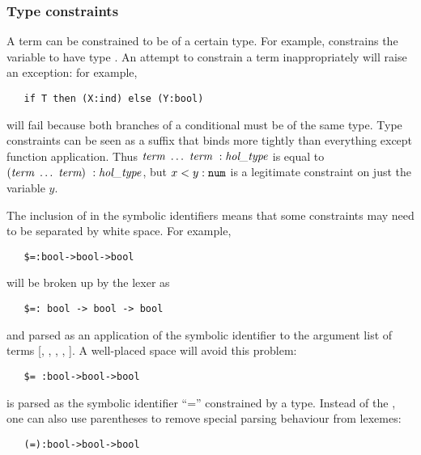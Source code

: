 \subsubsection{Type constraints}
\label{sec:parseprint-type-constraints}

A term can be constrained to be of a certain type.  For example,
 constrains the variable  to have type
. An attempt to constrain a
term inappropriately will raise an exception: for example,
\begin{hol}
\begin{verbatim}
   if T then (X:ind) else (Y:bool)
\end{verbatim}
\end{hol}
will fail because both branches of a conditional must be of the same
type.  Type constraints can be seen as a suffix that binds more
tightly than everything except function application.  Thus $\mbox{\it term}\
\ldots\ \mbox{\it term} \ : \mbox{\it hol\_type}$ is equal to $(\mbox{\it term}\ \ldots\ \mbox{\it term})\ :
\mbox{\it hol\_type}$, but $x < y:\holtxt{num}$ is a legitimate constraint on just
the variable $y$.

The inclusion of \holtxt{:} in the symbolic identifiers means that some
constraints may need to be separated by white space. For example,
\begin{hol}
\begin{verbatim}
   $=:bool->bool->bool
\end{verbatim}
\end{hol}
will be broken up by the \HOL{} lexer as
\begin{hol}
\begin{verbatim}
   $=: bool -> bool -> bool
\end{verbatim}
\end{hol}
and parsed as an application of the symbolic identifier \holtxt{\$=:} to
the argument list of terms [, \holtxt{->}, \holtxt{bool},
\holtxt{->}, \holtxt{bool}]. A well-placed space will avoid this problem:
\begin{hol}
\begin{verbatim}
   $= :bool->bool->bool
\end{verbatim}
\end{hol}
is parsed as the symbolic identifier ``='' constrained by a type.
Instead of the \holtxt{\$}, one can also use parentheses to remove
special parsing behaviour from lexemes:
\begin{hol}
\begin{verbatim}
   (=):bool->bool->bool
\end{verbatim}
\end{hol}

